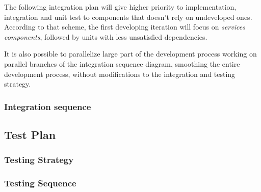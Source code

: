 The following integration plan will give higher priority to implementation, integration and unit test to components that doesn't rely on undeveloped ones.
According to that scheme, the first developing iteration will focus on \textit{services components}, followed by units with less unsatisfied dependencies.

It is also possible to parallelize large part of the development process working on parallel branches of the integration sequence diagram, smoothing the entire development process, without modifications to the integration and testing strategy.

\subsubsection{Integration sequence}

\subsection{Test Plan}
\subsubsection{Testing Strategy}
\subsubsection{Testing Sequence}